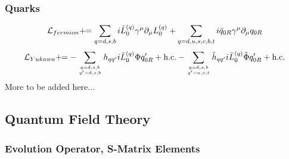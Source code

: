 \subsubsection{Quarks}


\begin{equation*}
  {\mathcal L}_{fermion}+\!\!= \sum_{q=d,s,b}i\bar L_0^{(q)}\gamma^\mu\partial_\mu L_0^{(q)} +\sum_{q=d,u,s,c,b,t}i\bar q_{0R}\gamma^\mu\partial_\mu q_{0R}
\end{equation*}
\begin{equation*}
  {\mathcal L}_{Yukawa}+\!\!= -\sum_{q=d,s,b\atop q'=d,s,b}h_{qq'}i\bar L_0^{(q)}\Phi q_{0R}'+\hbox{h.c.} -\sum_{q=d,s,b\atop q'=u,c,t}\tilde h_{qq'}i\bar L_0^{(q)}\tilde\Phi q_{0R}'+\hbox{h.c.}
\end{equation*}
More to be added here...

\subsection{Quantum Field Theory}

\subsubsection{Evolution Operator, S-Matrix Elements}


